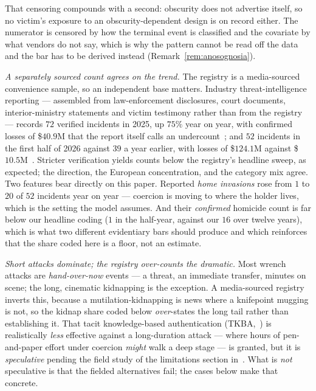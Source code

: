 That censoring compounds with a second: obscurity does not advertise itself, so no
victim's exposure to an obscurity-dependent design is on record either. The
numerator is censored by how the terminal event is classified and the covariate by
what vendors do not say, which is why the pattern cannot be read off the data and
the bar has to be derived instead (Remark~\ref{rem:anosognosia}).

\emph{A separately sourced count agrees on the trend.} The registry is a
media-sourced convenience sample, so an independent base matters. Industry
threat-intelligence reporting --- assembled from law-enforcement disclosures,
court documents, interior-ministry statements and victim testimony rather than
from the registry --- records $72$ verified incidents in 2025, up $75\%$ year on
year, with confirmed losses of \$$40.9$M that the report itself calls an
undercount~\cite{certik-skynet-2026}; and $52$ incidents in the first half of
2026 against $39$ a year earlier, with losses of \$$124.1$M against
\$$10.5$M~\cite{certik-intel3d-h1-2026}. Stricter verification yields counts
below the registry's headline sweep, as expected; the direction, the European
concentration, and the category mix agree. Two features bear directly on this
paper. Reported \emph{home invasions} rose from $1$ to $20$ of $52$ incidents
year on year --- coercion is moving to where the holder lives, which is the
setting the model assumes. And their \emph{confirmed} homicide count is far below
our headline coding ($1$ in the half-year, against our $16$ over twelve years),
which is what two different evidentiary bars should produce and which reinforces
that the share coded here is a floor, not an estimate.

\emph{Short attacks dominate; the registry over-counts the dramatic.} Most wrench
attacks are \emph{hand-over-now} events --- a threat, an immediate transfer, minutes
on scene; the long, cinematic kidnapping is the exception. A media-sourced registry
inverts this, because a mutilation-kidnapping is news where a knifepoint mugging is
not, so the kidnap share coded below \emph{over}-states the long tail rather than
establishing it. That tacit knowledge-based authentication (TKBA,~\cite[\S2]{deadly-race})
is realistically \emph{less} effective against a
long-duration attack --- where hours of pen-and-paper effort under coercion
\emph{might} walk a deep stage --- is granted, but it is \emph{speculative} pending
the field study of the limitations section in~\cite{deadly-race}. What is \emph{not} speculative is that the
fielded alternatives fail; the cases below make that concrete.

